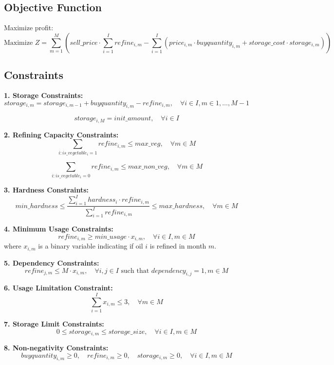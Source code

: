 \documentclass{article}
\begin{document}
\subsection*{Objective Function}
Maximize profit:
\[
\text{Maximize } Z = \sum_{m=1}^{M} \left( sell\_price \cdot \sum_{i=1}^{I} refine_{i,m} - \sum_{i=1}^{I} \left( price_{i,m} \cdot buyquantity_{i,m} + storage\_cost \cdot storage_{i,m} \right) \right)
\]

\subsection*{Constraints}

\textbf{1. Storage Constraints:}
\[
storage_{i,m} = storage_{i,m-1} + buyquantity_{i,m} - refine_{i,m}, \quad \forall i \in I, m \in 1,\ldots,M-1
\]

\[
storage_{i,M} = init\_amount, \quad \forall i \in I 
\]

\textbf{2. Refining Capacity Constraints:}
\[
\sum_{i : is\_vegetable_i = 1} refine_{i,m} \leq max\_veg, \quad \forall m \in M
\]

\[
\sum_{i : is\_vegetable_i = 0} refine_{i,m} \leq max\_non\_veg, \quad \forall m \in M
\]

\textbf{3. Hardness Constraints:}
\[
min\_hardness \leq \frac{\sum_{i=1}^{I} hardness_{i} \cdot refine_{i,m}}{\sum_{i=1}^{I} refine_{i,m}} \leq max\_hardness, \quad \forall m \in M
\]

\textbf{4. Minimum Usage Constraints:}
\[
refine_{i,m} \geq min\_usage \cdot x_{i,m}, \quad \forall i \in I, m \in M
\]
where \( x_{i,m} \) is a binary variable indicating if oil $i$ is refined in month $m$.

\textbf{5. Dependency Constraints:}
\[
refine_{j,m} \leq M \cdot x_{i,m}, \quad \forall i,j \in I \text{ such that } dependency_{i,j} = 1, m \in M
\]

\textbf{6. Usage Limitation Constraint:}
\[
\sum_{i=1}^{I} x_{i,m} \leq 3, \quad \forall m \in M
\]

\textbf{7. Storage Limit Constraints:}
\[
0 \leq storage_{i,m} \leq storage\_size, \quad \forall i \in I, m \in M
\]

\textbf{8. Non-negativity Constraints:}
\[
buyquantity_{i,m} \geq 0, \quad refine_{i,m} \geq 0, \quad storage_{i,m} \geq 0, \quad \forall i \in I, m \in M
\]
\end{document}
